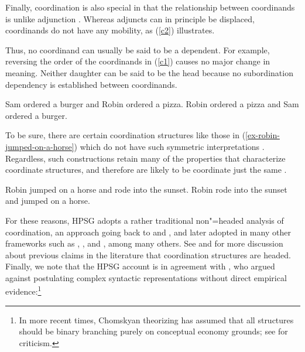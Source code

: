 Finally, coordination is also special in that the relationship between coordinands is unlike
adjunction \citep[--160]{levinepostal}.
Whereas adjuncts can in principle be displaced, coordinands do not have any mobility, as (\ref{c2}) illustrates.

\eal
\label{c2}
\zl


\noindent
Thus, no coordinand can usually be said to be a dependent. For example,  reversing the order of the coordinands in (\ref{c1}) causes no major change in meaning. Neither daughter can be said to be the head because no subordination dependency is established between coordinands.

\eal
\label{c1}
\ex Sam ordered a burger and Robin ordered a pizza.
\ex Robin ordered a pizza and Sam ordered a burger.
\zl

\noindent
To be sure, there are certain coordination structures like those in
(\ref{ex-robin-jumped-on-a-horse}) which do not have such symmetric 
interpretations \citep{goldsmith,lakoff86,levinprince86}.
Regardless, such constructions retain many of the properties that characterize coordinate structures, and therefore are likely to be
coordinate just the same \citep[Chapter~5]{kehler}.

\eal
\label{ex-robin-jumped-on-a-horse}
\ex Robin jumped on a horse and rode into the sunset.
\ex Robin rode into the sunset and jumped on a horse.
\zl

For these reasons, HPSG adopts a rather traditional non"=headed analysis of coordination, an approach  going back
to \citet[195]{bloom} and  \citet[Section~4.2]{ross67}, and later adopted in many other frameworks
such as \citet[Section~3.1]{pesetsky}, \citet[]{gazdarc}, and \citet[1275]{rodney}, among many others. 
See \citet{borsley94,Borsley2005a}
and 
\citet[Chapter~2]{chavesthesis} for more discussion about previous claims in the literature that coordination structures are headed.
Finally, we note that the HPSG account is in agreement with \citet[196]{chom65}, who argued against postulating complex syntactic representations without direct empirical evidence:\footnote{In more recent times, Chomskyan theorizing has assumed that all structures should be binary branching purely on conceptual economy grounds; see \citet{Johnson:Lappin:99} for criticism.}

